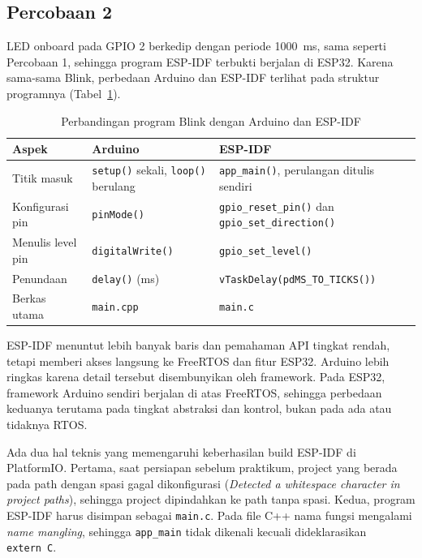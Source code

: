 \subsection{Percobaan 2}
LED onboard pada GPIO 2 berkedip dengan periode 1000~ms, sama seperti Percobaan 1, sehingga program ESP-IDF terbukti berjalan di ESP32. Karena sama-sama Blink, perbedaan Arduino dan ESP-IDF terlihat pada struktur programnya (Tabel~\ref{tab:arduino-idf}).
\begin{table}[H]
	\centering
	\caption{Perbandingan program Blink dengan Arduino dan ESP-IDF}
	\label{tab:arduino-idf}
	\begin{tabular}{|p{3.2cm}|p{5.6cm}|p{5.6cm}|}
		\hline
		\textbf{Aspek} & \textbf{Arduino} & \textbf{ESP-IDF} \\ \hline
		Titik masuk & \texttt{setup()} sekali, \texttt{loop()} berulang & \texttt{app\_main()}, perulangan ditulis sendiri \\ \hline
		Konfigurasi pin & \texttt{pinMode()} & \texttt{gpio\_reset\_pin()} dan \texttt{gpio\_set\_direction()} \\ \hline
		Menulis level pin & \texttt{digitalWrite()} & \texttt{gpio\_set\_level()} \\ \hline
		Penundaan & \texttt{delay()} (ms) & \texttt{vTaskDelay(pdMS\_TO\_TICKS())} \\ \hline
		Berkas utama & \texttt{main.cpp} & \texttt{main.c} \\ \hline
	\end{tabular}
\end{table}
ESP-IDF menuntut lebih banyak baris dan pemahaman API tingkat rendah, tetapi memberi akses langsung ke FreeRTOS dan fitur ESP32. Arduino lebih ringkas karena detail tersebut disembunyikan oleh framework. Pada ESP32, framework Arduino sendiri berjalan di atas FreeRTOS, sehingga perbedaan keduanya terutama pada tingkat abstraksi dan kontrol, bukan pada ada atau tidaknya RTOS.

Ada dua hal teknis yang memengaruhi keberhasilan build ESP-IDF di PlatformIO. Pertama, saat persiapan sebelum praktikum, project yang berada pada path dengan spasi gagal dikonfigurasi (\emph{Detected a whitespace character in project paths}), sehingga project dipindahkan ke path tanpa spasi. Kedua, program ESP-IDF harus disimpan sebagai \texttt{main.c}. Pada file C++ nama fungsi mengalami \emph{name mangling}, sehingga \texttt{app\_main} tidak dikenali kecuali dideklarasikan \texttt{extern~\textquotedbl C\textquotedbl}.

